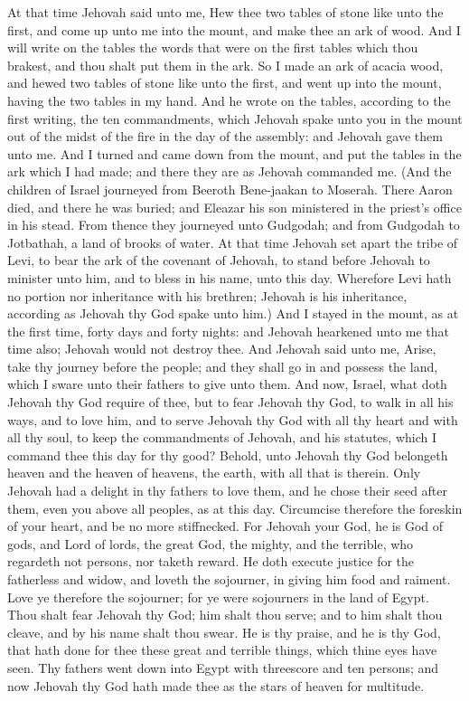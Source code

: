 At that time Jehovah said unto me, Hew thee two tables of stone like unto the first, and come up unto me into the mount, and make thee an ark of wood. And I will write on the tables the words that were on the first tables which thou brakest, and thou shalt put them in the ark. So I made an ark of acacia wood, and hewed two tables of stone like unto the first, and went up into the mount, having the two tables in my hand. And he wrote on the tables, according to the first writing, the ten commandments, which Jehovah spake unto you in the mount out of the midst of the fire in the day of the assembly: and Jehovah gave them unto me. And I turned and came down from the mount, and put the tables in the ark which I had made; and there they are as Jehovah commanded me. (And the children of Israel journeyed from Beeroth Bene-jaakan to Moserah. There Aaron died, and there he was buried; and Eleazar his son ministered in the priest’s office in his stead. From thence they journeyed unto Gudgodah; and from Gudgodah to Jotbathah, a land of brooks of water. At that time Jehovah set apart the tribe of Levi, to bear the ark of the covenant of Jehovah, to stand before Jehovah to minister unto him, and to bless in his name, unto this day. Wherefore Levi hath no portion nor inheritance with his brethren; Jehovah is his inheritance, according as Jehovah thy God spake unto him.) And I stayed in the mount, as at the first time, forty days and forty nights: and Jehovah hearkened unto me that time also; Jehovah would not destroy thee. And Jehovah said unto me, Arise, take thy journey before the people; and they shall go in and possess the land, which I sware unto their fathers to give unto them.  And now, Israel, what doth Jehovah thy God require of thee, but to fear Jehovah thy God, to walk in all his ways, and to love him, and to serve Jehovah thy God with all thy heart and with all thy soul, to keep the commandments of Jehovah, and his statutes, which I command thee this day for thy good? Behold, unto Jehovah thy God belongeth heaven and the heaven of heavens, the earth, with all that is therein. Only Jehovah had a delight in thy fathers to love them, and he chose their seed after them, even you above all peoples, as at this day. Circumcise therefore the foreskin of your heart, and be no more stiffnecked. For Jehovah your God, he is God of gods, and Lord of lords, the great God, the mighty, and the terrible, who regardeth not persons, nor taketh reward. He doth execute justice for the fatherless and widow, and loveth the sojourner, in giving him food and raiment. Love ye therefore the sojourner; for ye were sojourners in the land of Egypt. Thou shalt fear Jehovah thy God; him shalt thou serve; and to him shalt thou cleave, and by his name shalt thou swear. He is thy praise, and he is thy God, that hath done for thee these great and terrible things, which thine eyes have seen. Thy fathers went down into Egypt with threescore and ten persons; and now Jehovah thy God hath made thee as the stars of heaven for multitude. 

